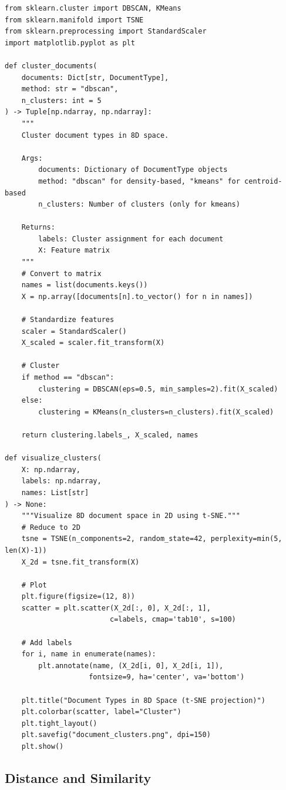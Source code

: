 \begin{verbatim}
from sklearn.cluster import DBSCAN, KMeans
from sklearn.manifold import TSNE
from sklearn.preprocessing import StandardScaler
import matplotlib.pyplot as plt

def cluster_documents(
    documents: Dict[str, DocumentType],
    method: str = "dbscan",
    n_clusters: int = 5
) -> Tuple[np.ndarray, np.ndarray]:
    """
    Cluster document types in 8D space.

    Args:
        documents: Dictionary of DocumentType objects
        method: "dbscan" for density-based, "kmeans" for centroid-based
        n_clusters: Number of clusters (only for kmeans)

    Returns:
        labels: Cluster assignment for each document
        X: Feature matrix
    """
    # Convert to matrix
    names = list(documents.keys())
    X = np.array([documents[n].to_vector() for n in names])

    # Standardize features
    scaler = StandardScaler()
    X_scaled = scaler.fit_transform(X)

    # Cluster
    if method == "dbscan":
        clustering = DBSCAN(eps=0.5, min_samples=2).fit(X_scaled)
    else:
        clustering = KMeans(n_clusters=n_clusters).fit(X_scaled)

    return clustering.labels_, X_scaled, names

def visualize_clusters(
    X: np.ndarray,
    labels: np.ndarray,
    names: List[str]
) -> None:
    """Visualize 8D document space in 2D using t-SNE."""
    # Reduce to 2D
    tsne = TSNE(n_components=2, random_state=42, perplexity=min(5, len(X)-1))
    X_2d = tsne.fit_transform(X)

    # Plot
    plt.figure(figsize=(12, 8))
    scatter = plt.scatter(X_2d[:, 0], X_2d[:, 1],
                         c=labels, cmap='tab10', s=100)

    # Add labels
    for i, name in enumerate(names):
        plt.annotate(name, (X_2d[i, 0], X_2d[i, 1]),
                    fontsize=9, ha='center', va='bottom')

    plt.title("Document Types in 8D Space (t-SNE projection)")
    plt.colorbar(scatter, label="Cluster")
    plt.tight_layout()
    plt.savefig("document_clusters.png", dpi=150)
    plt.show()
\end{verbatim}

\subsection{Distance and Similarity}

